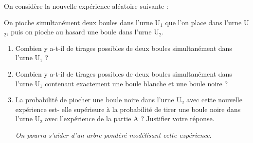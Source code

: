 \documentclass[10pt]{article}
\begin{document}
\medskip

On considère la nouvelle expérience aléatoire suivante :

On pioche simultanément deux boules dans l'urne U$_1$ que l'on place dans l'urne U$_2$, puis on pioche au hasard une boule dans l'urne U$_2$.

\medskip

\begin{enumerate}
\item Combien y a-t-il de tirages possibles de deux boules simultanément dans l'urne U$_1$ ?
\item Combien y a-t-il de tirages possibles de deux boules simultanément dans l'urne U$_1$
contenant exactement une boule blanche et une boule noire ?
\item La probabilité de piocher une boule noire dans l'urne U$_2$ avec cette nouvelle expérience est- elle supérieure à la probabilité de tirer une boule noire dans l'urne U$_2$ avec l'expérience de la partie A ? Justifier votre réponse.

\emph{On pourra s'aider d'un arbre pondéré modélisant cette expérience}.
\end{enumerate}

\bigskip
\end{document}
